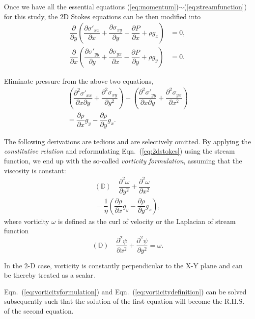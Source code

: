 \documentclass[11pt]{article}
\numberwithin{figure}{section}  %
\numberwithin{equation}{section}  %
\begin{document}
\begin{multicols}{2}
Once we have all the essential equations (\ref{eq:momentum})$\sim$(\ref{eq:streamfunction}) for this study, the 2D Stokes equations can be then modified into
\begin{align*}
    \dfrac{\partial}{\partial{y}}\left(\dfrac{\partial\sigma'_{xx}}{\partial{x}} + \dfrac{\partial\sigma_{xy}}{\partial{y}} - \dfrac{\partial{P}}{\partial{x}} + \rho{g}_x\right) &= 0, \\
    \dfrac{\partial}{\partial{x}}\left(\dfrac{\partial\sigma'_{yy}}{\partial{y}} + \dfrac{\partial\sigma_{yx}}{\partial{x}} - \dfrac{\partial{P}}{\partial{y}} + \rho{g}_y\right) &= 0.
\end{align*}

Eliminate pressure from the above two equations,
\begin{multline}\label{eq:2dstokes}
    \left(\dfrac{\partial^2\sigma'_{xx}}{\partial{x}\partial{y}}+\dfrac{\partial^2\sigma_{xy}}{\partial{y}^2}\right) - \left(\dfrac{\partial^2\sigma'_{yy}}{\partial{x}\partial{y}}+\dfrac{\partial^2\sigma_{yx}}{\partial{x}^2}\right) \\
    = \dfrac{\partial\rho}{\partial{x}}g_y - \dfrac{\partial\rho}{\partial{y}}g_x.
\end{multline}

The following derivations are tedious and are selectively omitted. By applying the \emph{constitutive relation} and reformulating Eqn.\ (\ref{eq:2dstokes}) using the stream function, we end up with the so-called \emph{vorticity formulation}, assuming that the viscosity is constant:
\begin{multline}\label{eq:vorticityformulation}
    (\mathbb{D})\quad\dfrac{\partial^2\omega}{\partial{y}^2} + \dfrac{\partial^2\omega}{\partial{x}^2} \\
    = \dfrac{1}{\eta}\left(\dfrac{\partial\rho}{\partial{x}}g_y - \dfrac{\partial\rho}{\partial{y}}g_x\right),
\end{multline}
where vorticity $\omega$ is defined as the curl of velocity or the Laplacian of stream function
\begin{equation}\label{eq:vorticitydefinition}
    (\mathbb{D})\quad\dfrac{\partial^2\psi}{\partial{x}^2} + \dfrac{\partial^2\psi}{\partial{y}^2} = \omega.
\end{equation}

In the 2-D case, vorticity is constantly perpendicular to the X-Y plane and can be thereby treated as a scalar.

Eqn.\ (\ref{eq:vorticityformulation}) and Eqn.\ (\ref{eq:vorticitydefinition}) can be solved subsequently such that the solution of the first equation will become the R.H.S. of the second equation.


\end{multicols}
\end{document}
